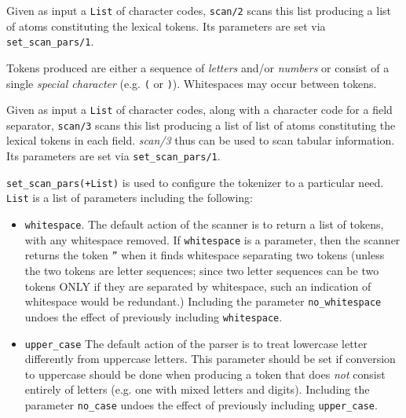 \begin{description}

   

Given as input a {\tt List} of character codes, {\tt scan/2} scans
this list producing a list of atoms constituting the lexical tokens.
Its parameters are set via {\tt set\_scan\_pars/1}.

Tokens produced are either a sequence of {\em letters} and/or {\em
numbers} or consist of a single {\em special character} (e.g. {\tt (}
or {\tt )}).  Whitespaces may occur between tokens.


Given as input a {\tt List} of character codes, along with a character
code for a field separator, {\tt scan/3} scans this list producing a
list of list of atoms constituting the lexical tokens in each field.
{\em scan/3} thus can be used to scan tabular information.  Its
parameters are set via {\tt set\_scan\_pars/1}.


{\tt set\_scan\_pars(+List)} is used to configure the tokenizer to a
particular need.  {\tt List} is a list of parameters including the
following:

\begin{itemize}

\item{{\tt whitespace}}.  The default action of the scanner is to return a
list of tokens, with any whitespace removed.  If {\tt whitespace} is a
parameter, then the scanner returns the token {\tt ''} when it finds
whitespace separating two tokens (unless the two tokens are letter
sequences; since two letter sequences can be two tokens ONLY if they
are separated by whitespace, such an indication of whitespace would be
redundant.)  Including the parameter {\tt no\_whitespace} undoes the
effect of previously including {\tt whitespace}.

\item{{\tt upper\_case}} The default action of the parser is to treat
lowercase letter differently from uppercase letters.  This parameter
should be set if conversion to uppercase should be done when producing
a token that does {\em not} consist entirely of letters (e.g. one with
mixed letters and digits).  Including the parameter {\tt no\_case}
undoes the effect of previously including {\tt upper\_case}.


\end{itemize}
\end{description}

